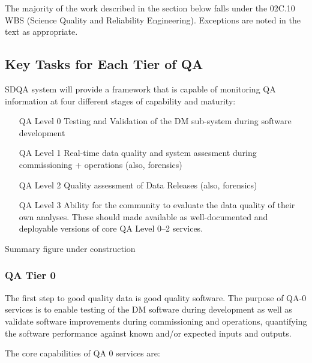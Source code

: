 The majority of the work described in the section below falls under the
02C.10 WBS (Science Quality and Reliability Engineering). Exceptions
are noted in the text as appropriate.

\subsection{Key Tasks for Each Tier of QA}

SDQA system will provide a framework that is capable of monitoring QA
information at four different stages of capability and maturity:

\begin{itemize}
\item[QA Level 0] Testing and Validation of the DM sub-system during software development
\item[QA Level 1] Real-time data quality and system assesment during commissioning + operations (also, forensics)
\item[QA Level 2] Quality assessment of Data Releases (also, forensics)
\item[QA Level 3] Ability for the community to evaluate the data quality of their own analyses. These should made available as well-documented and deployable versions of core QA Level 0--2 services.
\end{itemize}

\begin{note}
Summary figure under construction
\end{note}



\subsubsection{QA Tier 0}

The first step to good quality data is good quality software. The
purpose of QA-0 services is to enable testing of the DM software during
development as well as validate software improvements during
commissioning and operations, quantifying the software performance
against known and/or expected inputs and outputs.

The core capabilities of QA 0 services are:

